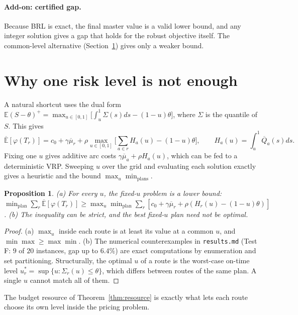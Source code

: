 \documentclass[11pt]{article}
\newtheorem{proposition}[theorem]{Proposition}
\theoremstyle{definition}
\newcommand{\E}{\mathbb{E}}
\newcommand{\Eu}{\overline{\mathbb{E}}}
\newcommand{\Qb}{\overline{Q}}
\newcommand{\mub}{\overline{\mu}}
\newcommand{\pos}[1]{\left(#1\right)^{+}}
\begin{document}
\paragraph{Add-on: certified gap.} Because BRL is exact, the final master value is a valid lower bound, and any integer solution gives a gap that holds for the robust objective itself. The common-level alternative (Section~\ref{sec:fixedu}) gives only a weaker bound.

\section{Why one risk level is not enough}\label{sec:fixedu}

A natural shortcut uses the dual form $\E\pos{S-\theta}=\max_{u\in[0,1]}\big[\int_u^1\Sigma(s)ds-(1-u)\theta\big]$, where $\Sigma$ is the quantile of $S$. This gives
\[
\Eu[\varphi(T_r)]=c_0+\gamma\mub_r+\rho\max_{u\in[0,1]}\Big[\sum_{a\in r}H_a(u)-(1-u)\theta\Big],\qquad H_a(u)=\int_u^1\Qb_a(s)ds .
\]
Fixing one $u$ gives additive arc costs $\gamma\mub_a+\rho H_a(u)$, which can be fed to a deterministic VRP. Sweeping $u$ over the grid and evaluating each solution exactly gives a heuristic and the bound $\max_u\min_{\text{plans}}$.

\begin{proposition}\label{prop:fixedu}
(a) For every $u$, the fixed-$u$ problem is a lower bound: $\min_{\text{plan}}\sum_{r}\Eu[\varphi(T_r)]\ge\max_u\min_{\text{plan}}\sum_r[c_0+\gamma\mub_r+\rho(H_r(u)-(1-u)\theta)]$.
(b) The inequality can be strict, and the best fixed-$u$ plan need not be optimal.
\end{proposition}
\begin{proof}
(a) $\max_u$ inside each route is at least its value at a common $u$, and $\min\max\ge\max\min$. (b) The numerical counterexamples in \texttt{results.md} (Test F: $9$ of $20$ instances, gap up to $6.4\%$) are exact computations by enumeration and set partitioning. Structurally, the optimal $u$ of a route is the worst-case on-time level $u^*_r=\sup\{u:\Sigma_r(u)\le\theta\}$, which differs between routes of the same plan. A single $u$ cannot match all of them.
\end{proof}

The budget resource of Theorem~\ref{thm:resource} is exactly what lets each route choose its own level inside the pricing problem.

\end{document}

